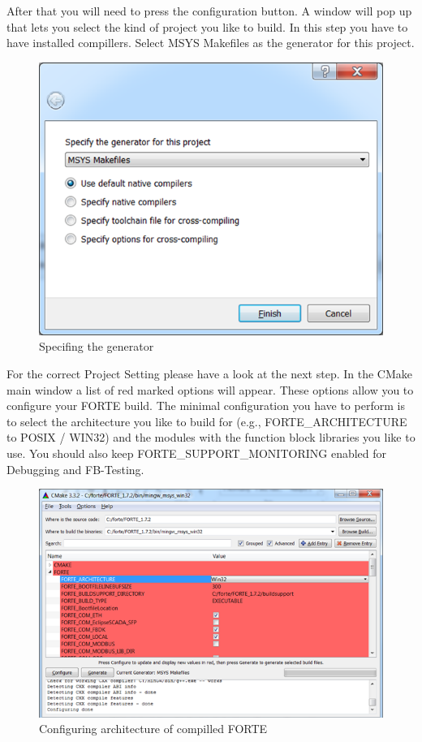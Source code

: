 After that you will need to press the configuration button. A window will pop up that lets you select the kind of project you like to build. In this step you have to have installed compillers. 
Select MSYS Makefiles as the generator for this project.

\begin{figure}
\centering
\includegraphics{Figures/cmake-2}
\decoRule
\caption[CMake step 2]{Specifing the generator}
\label{fig:cmake-2}
\end{figure}
 

For the correct Project Setting please have a look at the next step. In the CMake main window a list of red marked options will appear. These options allow you to configure your FORTE build. The minimal configuration you have to perform is to select the architecture you like to build for (e.g., FORTE\_ARCHITECTURE to POSIX / WIN32) and the modules with the function block libraries you like to use. You should also keep FORTE\_SUPPORT\_MONITORING enabled for Debugging and FB-Testing.

\begin{figure}
\centering
\includegraphics{Figures/cmake-3}
\decoRule
\caption[CMake step 3]{Configuring architecture of compilled FORTE}
\label{fig:cmake-3}
\end{figure}
 

